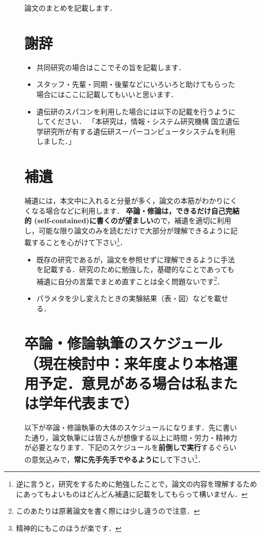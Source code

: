 \documentclass[dvipdfmx,autodetect-engine]{jsreport}
\begin{document}
\begin{figure}[h]
{論文のまとめを記載します．

\chapter*{謝辞}

\begin{itemize}
\item 共同研究の場合はここでその旨を記載します．
\item スタッフ・先輩・同期・後輩などにいろいろと助けてもらった場合にはここに記載してもいいと思います．
\item 遺伝研のスパコンを利用した場合には以下の記載を行うようにしてください．
「本研究は，情報・システム研究機構 国立遺伝学研究所が有する遺伝研スーパーコンピュータシステムを利用しました．」
\end{itemize}




\clearpage

\appendix 

\chapter{補遺}

補遺には，本文中に入れると分量が多く，論文の本筋がわかりにくくなる場合などに利用します．
\textbf{卒論・修論は，できるだけ自己完結的 (self-contained)に書くのが望ましい}ので，補遺を適切に利用し，可能な限り論文のみを読むだけで大部分が理解できるように記載することを心がけて下さい\footnote{逆に言うと，研究をするために勉強したことで，論文の内容を理解するためにあってもよいものはどんどん補遺に記載をしてもらって構いません．}．
\begin{itemize}
\item 既存の研究であるが，論文を参照せずに理解できるように手法を記載する．研究のために勉強した，基礎的なことであっても補遺に自分の言葉でまとめ直すことは全く問題ないです\footnote{このあたりは原著論文を書く際には少し違うので注意．}．
\item パラメタを少し変えたときの実験結果（表・図）などを載せる．
\end{itemize}


\chapter{卒論・修論執筆のスケジュール（現在検討中：来年度より本格運用予定．意見がある場合は私または学年代表まで）}

以下が卒論・修論執筆の大体のスケジュールになります．先に書いた通り，論文執筆には皆さんが想像する以上に時間・労力・精神力が必要となります．下記のスケジュールを\textbf{前倒しで実行}するぐらいの意気込みで，\textbf{常に先手先手でやるように}して下さい\footnote{精神的にもこのほうが楽です．}．

}
\end{figure}
\end{document}
